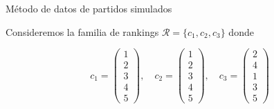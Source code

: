 \documentclass[10pt,hyperref={unicode}]{beamer}
\begin{document}
	\begin{frame}{Método de datos de partidos simulados}
		\begin{ejemplo}
			Consideremos la familia de rankings $\mathcal{R} = \{c_1, c_2, c_3\}$ donde
			
			\begin{equation*}
			c_1 = \left( \begin{array}{c}
			1\\
			2\\
			3\\
			4\\
			5
			\end{array} \right), \quad
			c_2 = \left( \begin{array}{c}
			1\\
			2\\
			3\\
			4\\
			5
			\end{array} \right), \quad
			c_3 = \left( \begin{array}{c}
			2\\
			4\\
			1\\
			3\\
			5
			\end{array} \right)
			\end{equation*}
			
		\end{ejemplo}
	\end{frame}
	
\end{document}
